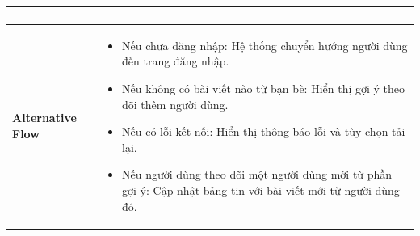 \begin{longtable}{|>{\bfseries}m{4cm}|m{10cm}|}
\begin{enumerate}
\end{enumerate} \\
\hline
Alternative Flow &
\begin{itemize}
    \item Nếu chưa đăng nhập: Hệ thống chuyển hướng người dùng đến trang đăng nhập.
    \item Nếu không có bài viết nào từ bạn bè: Hiển thị gợi ý theo dõi thêm người dùng.
    \item Nếu có lỗi kết nối: Hiển thị thông báo lỗi và tùy chọn tải lại.
    \item Nếu người dùng theo dõi một người dùng mới từ phần gợi ý: Cập nhật bảng tin với bài viết mới từ người dùng đó.
\end{itemize} \\
\hline
\end{longtable}

\newpage

